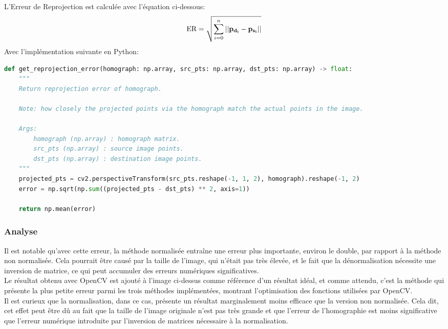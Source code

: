 \documentclass[../5RO17_TP1.tex]{subfiles}
\begin{document}
\noindent L'Erreur de Reprojection est calculée avec l'équation ci-dessous:
\begin{equation}
    \text{ER} = \sqrt{\sum^{n}_{i=0} ||\bf{p}_{d_{i}} - \bf{p}_{s_{i}}||}
\end{equation}
\noindent Avec l'implémentation suivante en Python:
\begin{scriptsize}\mycode
	\begin{lstlisting}[language=Python]
def get_reprojection_error(homograph: np.array, src_pts: np.array, dst_pts: np.array) -> float:
    """
    Return reprojection error of homograph.

    Note: how closely the projected points via the homograph match the actual points in the image.

    Args:
        homograph (np.array) : homograph matrix.
        src_pts (np.array) : source image points.
        dst_pts (np.array) : destination image points.
    """
    projected_pts = cv2.perspectiveTransform(src_pts.reshape(-1, 1, 2), homograph).reshape(-1, 2)
    error = np.sqrt(np.sum((projected_pts - dst_pts) ** 2, axis=1))

    return np.mean(error)
	\end{lstlisting}
\end{scriptsize}

\subsubsection{Analyse}
\noindent Il est notable qu'avec cette erreur, la méthode normalisée entraîne une erreur plus importante, environ le double, par rapport à la méthode non normalisée. Cela pourrait être causé par la taille de l'image, qui n'était pas très élevée, et le fait que la dénormalisation nécessite une inversion de matrice, ce qui peut accumuler des erreurs numériques significatives.\\

\noindent Le résultat obtenu avec OpenCV est ajouté à l'image ci-dessus comme référence d'un résultat idéal, et comme attendu, c'est la méthode qui présente la plus petite erreur parmi les trois méthodes implémentées, montrant l'optimisation des fonctions utilisées par OpenCV.\\

\noindent Il est curieux que la normalisation, dans ce cas, présente un résultat marginalement moins efficace que la version non normalisée. Cela dit, cet effet peut être dû au fait que la taille de l'image originale n'est pas très grande et que l'erreur de l'homographie est moins significative que l'erreur numérique introduite par l'inversion de matrices nécessaire à la normalisation.
\end{document}
